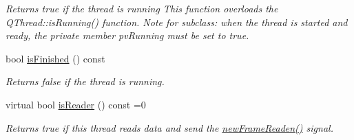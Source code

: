 \begin{DoxyCompactItemize}
\begin{DoxyCompactList}\small\item\em Returns true if the thread is running This function overloads the QThread::isRunning() function. Note for subclass: when the thread is started and ready, the private member pvRunning must be set to true. \end{DoxyCompactList}\item 
bool \hyperlink{classmdt_port_thread_a55d7ef615447823bf9878492a2c88fd4}{isFinished} () const 
\begin{DoxyCompactList}\small\item\em Returns false if the thread is running. \end{DoxyCompactList}\item 
virtual bool \hyperlink{classmdt_port_thread_a3d57f15a864ae45c98eb40dd89f4cec6}{isReader} () const =0
\begin{DoxyCompactList}\small\item\em Returns true if this thread reads data and send the \hyperlink{classmdt_port_thread_a7fc2245c753fd65e1beffec211c41461}{newFrameReaden()} signal. \end{DoxyCompactList}\end{DoxyCompactItemize}
